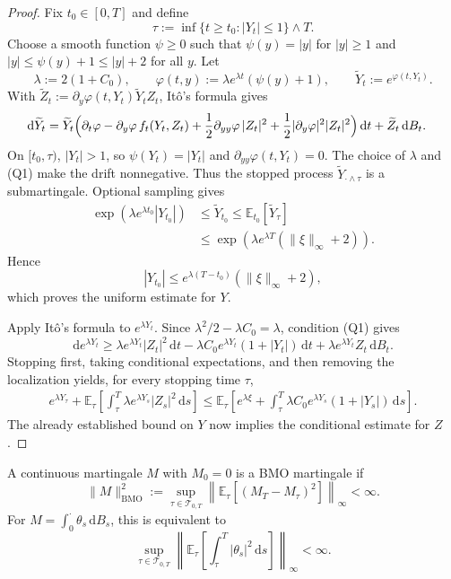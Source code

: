 \begin{proof}
Fix $t_0\in[0,T]$ and define
\[
  \tau:=\inf\{t\ge t_0:|Y_t|\le1\}\wedge T.
\]
Choose a smooth function $\psi\ge0$ such that
$\psi(y)=|y|$ for $|y|\ge1$ and
$|y|\le\psi(y)+1\le|y|+2$ for all $y$.  Let
\[
  \lambda:=2(1+C_0),
  \qquad
  \varphi(t,y):=\lambda e^{\lambda t}(\psi(y)+1),
  \qquad
  \widetilde Y_t:=e^{\varphi(t,Y_t)}.
\]
With
$\widetilde Z_t:=\partial_y\varphi(t,Y_t)\widetilde Y_tZ_t$, It\^o's
formula gives
\[
\begin{aligned}
  \mathrm d\widetilde Y_t
  =\widetilde Y_t\Bigl(&\partial_t\varphi
    -\partial_y\varphi\, f_t(Y_t,Z_t)
    +\frac12\partial_{yy}\varphi\,|Z_t|^2
    +\frac12|\partial_y\varphi|^2|Z_t|^2\Bigr)\,\mathrm dt
    +\widetilde Z_t\,\mathrm dB_t.
\end{aligned}
\]
On $[t_0,\tau)$, $|Y_t|>1$, so $\psi(Y_t)=|Y_t|$ and
$\partial_{yy}\varphi(t,Y_t)=0$.  The choice of $\lambda$ and
\textup{(Q1)} make the drift nonnegative.  Thus the stopped process
$\widetilde Y_{\cdot\wedge\tau}$ is a submartingale.  Optional sampling
gives
\[
\begin{aligned}
  \exp\!\left(\lambda e^{\lambda t_0}|Y_{t_0}|\right)
  &\le\widetilde Y_{t_0}
   \le\mathbb E_{t_0}[\widetilde Y_\tau]\\
  &\le\exp\!\left(
    \lambda e^{\lambda T}(\|\xi\|_\infty+2)
  \right).
\end{aligned}
\]
Hence
\[
  |Y_{t_0}|
  \le e^{\lambda(T-t_0)}(\|\xi\|_\infty+2),
\]
which proves the uniform estimate for $Y$.

Apply It\^o's formula to $e^{\lambda Y_t}$.  Since
$\lambda^2/2-\lambda C_0=\lambda$, condition \textup{(Q1)} gives
\[
  \mathrm d e^{\lambda Y_t}
  \ge \lambda e^{\lambda Y_t}|Z_t|^2\,\mathrm dt
      -\lambda C_0e^{\lambda Y_t}(1+|Y_t|)\,\mathrm dt
      +\lambda e^{\lambda Y_t}Z_t\,\mathrm dB_t.
\]
Stopping first, taking conditional expectations, and then removing the
localization yields, for every stopping time $\tau$,
\[
\begin{aligned}
  e^{\lambda Y_\tau}
  +\mathbb E_\tau\!\left[
    \int_\tau^T\lambda e^{\lambda Y_s}|Z_s|^2\,\mathrm ds
  \right]
  \le\mathbb E_\tau\!\left[
    e^{\lambda\xi}
    +\int_\tau^T\lambda C_0e^{\lambda Y_s}(1+|Y_s|)\,\mathrm ds
  \right].
\end{aligned}
\]
The already established bound on $Y$ now implies the conditional estimate
for $Z$.
\end{proof}

\begin{de}
A continuous martingale $M$ with $M_0=0$ is a BMO martingale if
\[
  \|M\|_{\mathrm{BMO}}^2
  :=\sup_{\tau\in\mathcal T_{0,T}}
    \left\|
      \mathbb E_\tau[(M_T-M_\tau)^2]
    \right\|_\infty
  <\infty.
\]
For $M=\int_0^\cdot\theta_s\,\mathrm dB_s$, this is equivalent to
\[
  \sup_{\tau\in\mathcal T_{0,T}}
  \left\|
    \mathbb E_\tau\!\left[
      \int_\tau^T|\theta_s|^2\,\mathrm ds
    \right]
  \right\|_\infty<\infty.
\]
\end{de}

